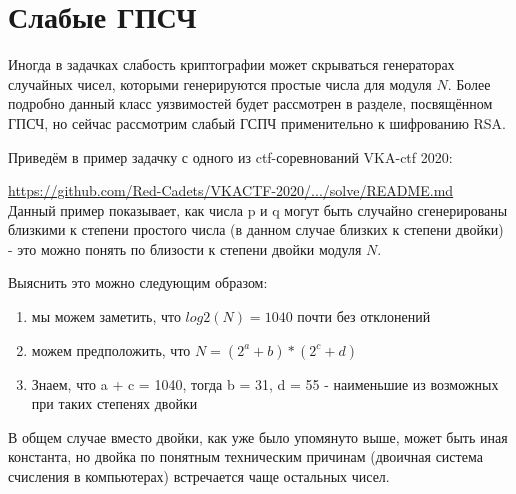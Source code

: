 \documentclass[12pt,a4paper]{scrartcl}
\begin{document}
\section{Слабые ГПСЧ}

Иногда в задачках слабость криптографии может скрываться генераторах случайных чисел, которыми генерируются простые числа для модуля $N$. Более подробно данный класс уязвимостей будет рассмотрен в разделе, посвящённом ГПСЧ, но сейчас рассмотрим слабый ГСПЧ применительно к шифрованию RSA.

Приведём в пример задачку с одного из ctf-соревнований VKA-ctf 2020:

\href{https://github.com/Red-Cadets/VKACTF-2020/blob/master/categories/crypto/Cry-1e-rsa_report/solve/README.md}{https://github.com/Red-Cadets/VKACTF-2020/.../solve/README.md}\\

Данный пример показывает, как числа p и q могут быть случайно сгенерированы близкими к степени простого числа (в данном случае близких к степени двойки) - это можно понять по близости к степени двойки модуля $N$.

Выяснить это можно следующим образом: 

\begin{enumerate}
	\item мы можем заметить, что $log2(N) = 1040$ почти без отклонений
	\item можем предположить, что $N = (2^{a} + b) * (2^{c} + d)$
	\item Знаем, что a + c = 1040, тогда b =  31, d = 55 - наименьшие из возможных при таких степенях двойки
\end{enumerate}

В общем случае вместо двойки, как уже было упомянуто выше, может быть иная константа, но двойка по понятным техническим причинам (двоичная система счисления в компьютерах) встречается чаще остальных чисел.
\end{document}
